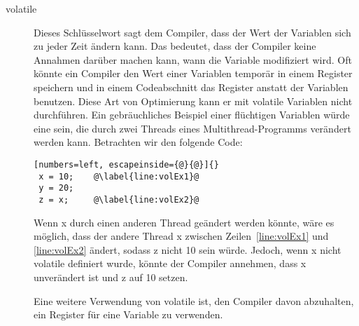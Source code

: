 \begin{description}
\item[volatile]
 Dieses Schl\"{u}sselwort sagt dem
Compiler, dass der Wert der Variablen sich zu jeder Zeit \"{a}ndern
kann. Das bedeutet, dass der Compiler keine Annahmen dar\"{u}ber machen
kann, wann die Variable modifiziert wird. Oft k\"{o}nnte ein Compiler
den Wert einer Variablen tempor\"{a}r in einem Register speichern und in
einem Codeabschnitt das Register anstatt der Variablen benutzen.
Diese Art von Optimierung kann er mit {\code volatile} Variablen
nicht durchf\"{u}hren. Ein gebr\"{a}uchliches Beispiel einer fl\"{u}chtigen
Variablen w\"{u}rde eine sein, die durch zwei Threads eines
Mul\-ti\-thread-Pro\-gramms ver\"{a}ndert werden kann. Betrachten wir
den folgende Code:
\begin{lstlisting}[numbers=left, escapeinside={@}{@}]{}
 x = 10;    @\label{line:volEx1}@
 y = 20;
 z = x;     @\label{line:volEx2}@
\end{lstlisting}
Wenn {\code x} durch einen anderen Thread ge\"{a}ndert werden k\"{o}nnte,
w\"{a}re es m\"{o}glich, dass der andere Thread {\code x} zwischen
Zeilen~\ref{line:volEx1} und \ref{line:volEx2} \"{a}ndert, sodass {\code
z} nicht 10 sein w\"{u}rde. Jedoch, wenn {\code x} nicht {\code
volatile} definiert wurde, k\"{o}nnte der Compiler annehmen, dass {\code
x} unver\"{a}ndert ist und {\code z} auf 10 setzen.
\enlargethispage{2\baselineskip}

Eine weitere Verwendung von {\code volatile} ist, den Compiler davon
abzuhalten, ein Register f\"{u}r eine Variable zu verwenden.

\end{description}
